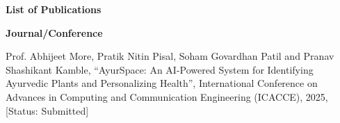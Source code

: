 \documentclass[12pt]{article}
\begin{document}
{\LARGE \textbf{List of Publications}}

\vspace{0.4cm}

\hspace{1cm}\textbf{Journal/Conference}

\vspace{10pt}

\noindent
\hspace{1.5cm}
\begin{minipage}{0.9\textwidth}
Prof. Abhijeet More, Pratik Nitin Pisal, Soham Govardhan Patil and Pranav Shashikant
Kamble, ``AyurSpace: An AI-Powered System for Identifying Ayurvedic Plants and
Personalizing Health'', International Conference on Advances in Computing and
Communication Engineering (ICACCE), 2025, [Status: Submitted]
\end{minipage}
\end{document}
